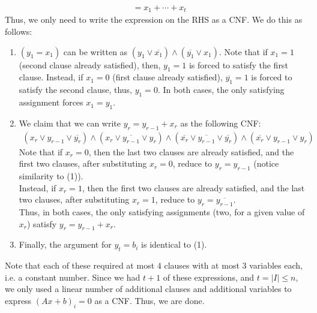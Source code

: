 \documentclass[12pt]{article}
\begin{document}
\begin{solution}
\begin{align*}
        &= x_1 + \cdots + x_t 
    \end{align*}
    Thus, we only need to write the expression on the RHS as a CNF. We do this as follows: 
    \begin{enumerate}
        \item $(y_1 = x_1)$ can be written as $(y_1 \lor \overline{x_1}) \land (\overline{y_1} \lor x_1)$. Note that if $x_1 = 1$ (second clause already satisfied), then, $y_1 = 1$ is forced to satisfy the first clause. Instead, if $x_1 = 0$ (first clause already satisfied), $\overline{y_1} = 1$ is forced to satisfy the second clause, thus, $y_1 = 0$. In both cases, the only satisfying assignment forces $x_1 = y_1$.
        \item We claim that we can write $y_r = y_{r-1} + x_r$ as the following CNF: 
        \begin{align*}
            (x_r \lor y_{r-1} \lor \overline{y_r}) \land (x_r \lor \overline{y_{r-1}} \lor y_r) \land (\overline{x_r} \lor \overline{y_{r-1}} \lor \overline{y_r}) \land (\overline{x_r} \lor y_{r-1} \lor y_r)
        \end{align*} 
        Note that if $x_r = 0$, then the last two clauses are already satisfied, and the first two clauses, after substituting $x_r = 0$, reduce to $y_r = y_{r-1}$ (notice similarity to (1)). \\
        Instead, if $x_r = 1$, then the first two clauses are already satisfied, and the last two clauses, after substituting $x_r = 1$, reduce to $y_r = \overline{y_{r-1}}$. \\
        Thus, in both cases, the only satisfying assignments (two, for a given value of $x_r$) satisfy $y_{r} = y_{r-1}+x_r$. 
        \item Finally, the argument for $y_t = b_i$ is identical to (1). 
    \end{enumerate}
    Note that each of these required at most $4$ clauses with at most $3$ variables each, i.e. a constant number. Since we had $t+1$ of these expressions, and $t = |I| \leq n $, we only used a linear number of additional clauses and additional variables to express $(Ax+b)_i = 0$ as a CNF. Thus, we are done.
\end{solution}


\newpage
\end{document}
